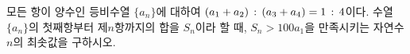 모든 항이 양수인 등비수열 $\{a_n\}$에 대하여 $(a_1+a_2)\mkern3mu :\mkern3mu (a_3+a_4)=1\mkern3mu :\mkern3mu 4$이다. 수열 $\{a_n\}$의 첫째항부터 제$n$항까지의 합을 $S_n$이라 할 때, $S_n>100a_1$을 만족시키는 자연수 $n$의 최솟값을 구하시오.
